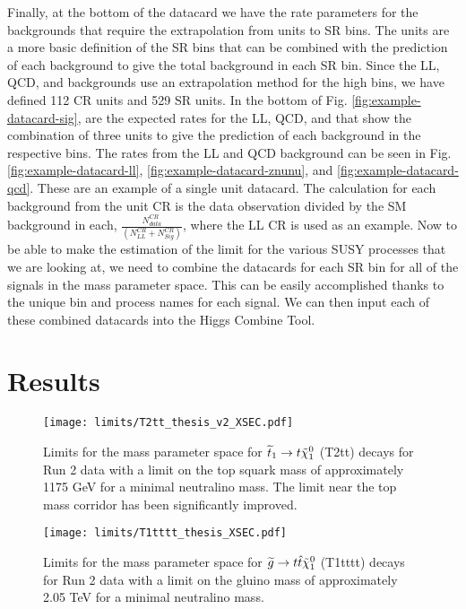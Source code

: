 Finally, at the bottom of the datacard we have the rate parameters for the backgrounds that require the extrapolation from units to SR bins. The units are a more basic definition of the SR bins that can be combined with the prediction of each background to give the total background in each SR bin. Since the LL, QCD, and \Znunu{} backgrounds use an extrapolation method for the high \dm{} bins, we have defined 112 CR units and 529 SR units. In the bottom of Fig. \ref{fig:example-datacard-sig}, are the expected rates for the LL, QCD, and \Znunu{} that show the combination of three units to give the prediction of each background in the respective bins. The rates from the LL and QCD background can be seen in Fig. \ref{fig:example-datacard-ll}, \ref{fig:example-datacard-znunu}, and  \ref{fig:example-datacard-qcd}. These are an example of a single unit datacard. The calculation for each background from the unit CR is the data observation divided by the SM background in each, $\frac{N_{data}^{CR}}{(N_{LL}^{CR} + N_{Sig}^{CR})}$, where the LL CR is used as an example. Now to be able to make the estimation of the limit for the various SUSY processes that we are looking at, we need to combine the datacards for each SR bin for all of the signals in the mass parameter space. This can be easily accomplished thanks to the unique bin and process names for each signal. We can then input each of these combined datacards into the Higgs Combine Tool.

\section{Results}\label{sec:Results}

\begin{figure}
	\begin{center}
  \texttt{[image: limits/T2tt\_thesis\_v2\_XSEC.pdf]}
	\end{center}
	\caption[Run 2: T2tt Limits]{Limits for the mass parameter space for $\widetilde{t}_1\rightarrow t \tilde{\chi}^{0}_{1}$ (T2tt) decays for Run 2 data with a limit on the top squark mass of approximately 1175 GeV for a minimal neutralino mass. The limit near the top mass corridor has been significantly improved.
	 }
	\label{fig:Run2-T2tt-limits}
\end{figure}

\begin{figure}
	\begin{center}
  \texttt{[image: limits/T1tttt\_thesis\_XSEC.pdf]}
	\end{center}
	\caption[Run 2: T1tttt Limits]{Limits for the mass parameter space for $\widetilde{g}\rightarrow t\hat{t}\tilde{\chi}^{0}_{1}$ (T1tttt) decays for Run 2 data with a limit on the gluino mass of approximately 2.05 TeV for a minimal neutralino mass.
	 }
	\label{fig:Run2-T1tttt-limits}
\end{figure}

